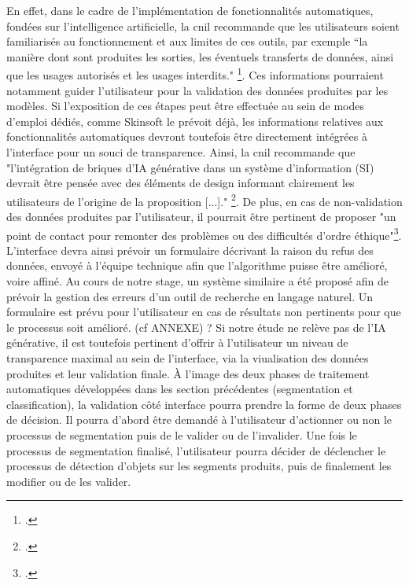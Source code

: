 En effet, dans le cadre de l'implémentation de fonctionnalités automatiques, fondées sur l'intelligence artificielle, la \gls{cnil} recommande que les utilisateurs soient familiarisés au fonctionnement et aux limites de ces outils, par exemple “la manière dont sont produites les sorties, les éventuels transferts de données, ainsi que les usages autorisés et les usages interdits." \footcite{zotero-item-729}. Ces informations pourraient notamment guider l’utilisateur pour la validation des données produites par les modèles. Si l'exposition de ces étapes peut être effectuée au sein de modes d'emploi dédiés, comme Skinsoft le prévoit déjà, les informations relatives aux fonctionnalités automatiques devront toutefois être directement intégrées à l’interface pour un souci de transparence. Ainsi, la \gls{cnil} recommande que "l’intégration de briques d’IA générative dans un système d’information (SI) devrait être pensée avec des éléments de design informant clairement les utilisateurs de l’origine de la proposition [...]." \footcite{zotero-item-729}.
De plus, en cas de non-validation des données produites par l'utilisateur, il pourrait être pertinent de proposer "un point de contact pour remonter des problèmes ou des difficultés d’ordre éthique"\footcite{zotero-item-729}. L’interface devra ainsi prévoir un formulaire décrivant la raison du refus des données, envoyé à l’équipe technique afin que l'algorithme puisse être amélioré, voire affiné. Au cours de notre stage, un système similaire a été proposé afin de prévoir la gestion des erreurs d'un outil de recherche en langage naturel. Un formulaire est prévu pour l'utilisateur en cas de résultats non pertinents pour que le processus soit amélioré. (cf ANNEXE) ? 
Si notre étude ne relève pas de l'IA générative, il est toutefois pertinent d'offrir à l'utilisateur un niveau de transparence maximal au sein de l'interface, via la viualisation des données produites et leur validation finale. À l'image des deux phases de traitement automatiques développées dans les section précédentes (segmentation et classification), la validation côté interface pourra prendre la forme de deux phases de décision. Il pourra d'abord être demandé à l'utilisateur d'actionner ou non le processus de segmentation puis de le valider ou de l'invalider. Une fois le processus de segmentation finalisé, l'utilisateur pourra décider de déclencher le processus de détection d'objets sur les segments produits, puis de finalement les modifier ou de les valider.
